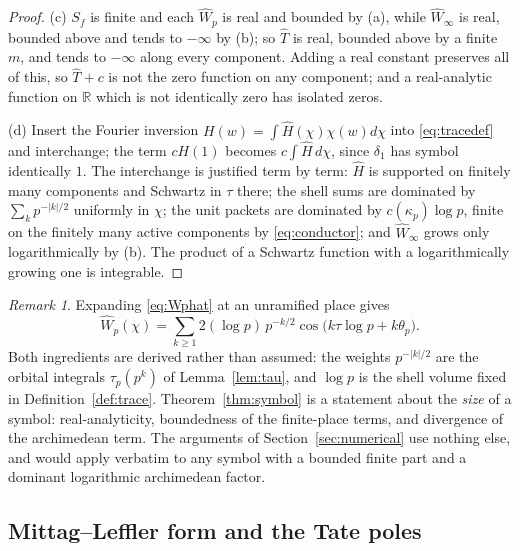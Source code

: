 \documentclass[11pt]{amsart}
\theoremstyle{definition}
\theoremstyle{remark}
\newtheorem{remark}[theorem]{Remark}
\newcommand{\R}{\mathbb R}
\newcommand{\Th}{\widehat{T}}
\newcommand{\Wh}{\widehat{W}}
\begin{document}
\begin{proof}
(c)  $S_f$ is finite and each $\Wh_p$ is real and bounded by (a), while
$\Wh_{\infty}$ is real, bounded above and tends to $-\infty$ by (b); so $\Th$
is real, bounded above by a finite $m$, and tends to $-\infty$ along every
component.  Adding a real constant preserves all of this, so $\Th+c$ is not the
zero function on any component; and a real-analytic function on $\R$ which is
not identically zero has isolated zeros.

(d)  Insert the Fourier inversion $H(w)=\int\widehat H(\chi)\chi(w)d\chi$ into
\eqref{eq:tracedef} and interchange; the term $cH(1)$ becomes
$c\int\widehat H\,d\chi$, since $\delta_1$ has symbol identically $1$.  The
interchange is justified term by term: $\widehat H$ is supported on finitely many
components and Schwartz in $\tau$ there; the shell sums are dominated by
$\sum_kp^{-|k|/2}$ uniformly in $\chi$; the unit packets are dominated by
$c(\kappa_p)\log p$, finite on the finitely many active components by
\eqref{eq:conductor}; and $\Wh_{\infty}$ grows only logarithmically by (b).
The product of a Schwartz function with a logarithmically growing one is
integrable.
\end{proof}

\begin{remark}\label{rem:symbolshape}
Expanding \eqref{eq:Wphat} at an unramified place gives
\begin{equation}\label{eq:symbolexp}
\Wh_p(\chi)=\sum_{k\ge1}2(\log p)\,p^{-k/2}
\cos\bigl(k\tau\log p+k\theta_p\bigr).
\end{equation}
Both ingredients are derived rather than assumed: the weights $p^{-|k|/2}$ are
the orbital integrals $\tau_p(p^{k})$ of Lemma~\ref{lem:tau}, and $\log p$ is
the shell volume fixed in Definition~\ref{def:trace}.  Theorem~\ref{thm:symbol}
is a statement about the \emph{size} of a symbol: real-analyticity, boundedness
of the finite-place terms, and divergence of the archimedean term.  The
arguments of Section~\ref{sec:numerical} use nothing else, and would apply
verbatim to any symbol with a bounded finite part and a dominant logarithmic
archimedean factor.
\end{remark}

\subsection{Mittag--Leffler form and the Tate poles}
\end{document}
